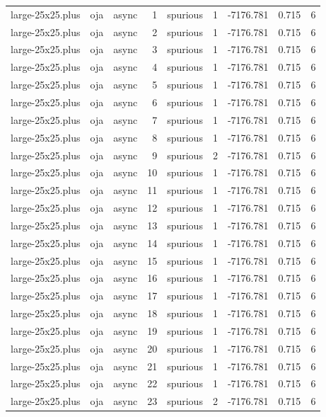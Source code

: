 \begin{tabular}{lllrlrrrr}
large-25x25.plus & oja & async & 1 & spurious & 1 & -7176.781 & 0.715 & 6 \\
large-25x25.plus & oja & async & 2 & spurious & 1 & -7176.781 & 0.715 & 6 \\
large-25x25.plus & oja & async & 3 & spurious & 1 & -7176.781 & 0.715 & 6 \\
large-25x25.plus & oja & async & 4 & spurious & 1 & -7176.781 & 0.715 & 6 \\
large-25x25.plus & oja & async & 5 & spurious & 1 & -7176.781 & 0.715 & 6 \\
large-25x25.plus & oja & async & 6 & spurious & 1 & -7176.781 & 0.715 & 6 \\
large-25x25.plus & oja & async & 7 & spurious & 1 & -7176.781 & 0.715 & 6 \\
large-25x25.plus & oja & async & 8 & spurious & 1 & -7176.781 & 0.715 & 6 \\
large-25x25.plus & oja & async & 9 & spurious & 2 & -7176.781 & 0.715 & 6 \\
large-25x25.plus & oja & async & 10 & spurious & 1 & -7176.781 & 0.715 & 6 \\
large-25x25.plus & oja & async & 11 & spurious & 1 & -7176.781 & 0.715 & 6 \\
large-25x25.plus & oja & async & 12 & spurious & 1 & -7176.781 & 0.715 & 6 \\
large-25x25.plus & oja & async & 13 & spurious & 1 & -7176.781 & 0.715 & 6 \\
large-25x25.plus & oja & async & 14 & spurious & 1 & -7176.781 & 0.715 & 6 \\
large-25x25.plus & oja & async & 15 & spurious & 1 & -7176.781 & 0.715 & 6 \\
large-25x25.plus & oja & async & 16 & spurious & 1 & -7176.781 & 0.715 & 6 \\
large-25x25.plus & oja & async & 17 & spurious & 1 & -7176.781 & 0.715 & 6 \\
large-25x25.plus & oja & async & 18 & spurious & 1 & -7176.781 & 0.715 & 6 \\
large-25x25.plus & oja & async & 19 & spurious & 1 & -7176.781 & 0.715 & 6 \\
large-25x25.plus & oja & async & 20 & spurious & 1 & -7176.781 & 0.715 & 6 \\
large-25x25.plus & oja & async & 21 & spurious & 1 & -7176.781 & 0.715 & 6 \\
large-25x25.plus & oja & async & 22 & spurious & 1 & -7176.781 & 0.715 & 6 \\
large-25x25.plus & oja & async & 23 & spurious & 2 & -7176.781 & 0.715 & 6 \\

\end{tabular}
